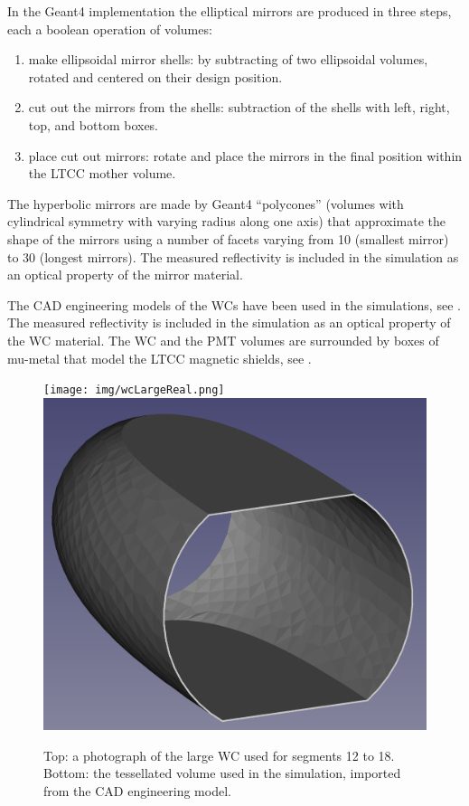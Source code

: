 In the Geant4 implementation the elliptical mirrors are produced in three steps, each a boolean operation of volumes:

\begin{enumerate}
\item make ellipsoidal mirror shells: by subtracting of two ellipsoidal volumes, rotated and centered on their design
  position.
	\item cut out the mirrors from the shells: subtraction of the shells with left, right, top, and bottom boxes.
	\item place cut out mirrors: rotate and place the mirrors in the final position within the LTCC mother volume.
\end{enumerate}

The hyperbolic mirrors are made by Geant4 ``polycones'' (volumes with cylindrical symmetry
with varying radius along one axis) that approximate the shape of the mirrors using a number of facets
varying from 10 (smallest mirror) to 30 (longest mirrors). The measured reflectivity is included in the simulation as
an optical property of the mirror material.

The CAD engineering models of the WCs have been used in the simulations, see .
The measured reflectivity is included in the simulation as an optical property of the WC material.
The WC and the PMT volumes are surrounded by boxes of mu-metal that model the LTCC magnetic shields, see .

\begin{figure}
	\centering
	\texttt{[image: img/wcLargeReal.png]}
	\includegraphics[width=0.99\columnwidth,keepaspectratio]{img/wcLargeSim.png}
	\caption{Top: a photograph of the large WC used for segments 12 to 18. Bottom: the tessellated volume used in the
            simulation, imported from the CAD engineering model.}
	\label{fig:wcSimulation}
\end{figure}

